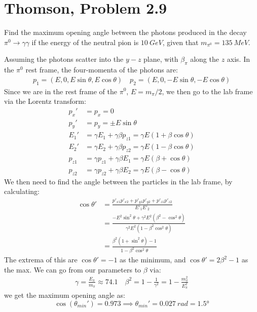 \documentclass[12pt]{article}
\begin{document}
\section{Thomson, Problem 2.9}
\begin{problem}
  Find the maximum opening angle between the photons produced in the decay $\pi^0\to\gamma\gamma$ if the energy of the neutral pion is $\SI{10}{GeV}$, given that $m_{\pi^0}=\SI{135}{MeV}$.
\end{problem}
Assuming the photons scatter into the $y-z$ plane, with $\beta_\pi$ along the $z$ axis. In the $\pi^0$ rest frame, the four-momenta of the photons are:
\begin{align*}
  p_1=(E, 0, E\sin\theta, E\cos\theta)\quad
  p_2=(E, 0,-E\sin\theta,-E\cos\theta)
\end{align*}
Since we are in the rest frame of the $\pi^0$, $E=m_\pi/2$, we then go to the lab frame via the Lorentz transform:
\begin{align*}
  p_x'&=p_x=0\\
  p_y'&=p_y=\pm E\sin\theta\\
  E_1'&=\gamma E_1+\gamma\beta p_{z1}=\gamma E(1+\beta\cos\theta)\\
  E_2'&=\gamma E_2+\gamma\beta p_{z2}=\gamma E(1-\beta\cos\theta)\\
  p_{z1}&=\gamma p_{z1}+\gamma\beta E_1=\gamma E(\beta+\cos\theta)\\
  p_{z2}&=\gamma p_{z2}+\gamma\beta E_2=\gamma E(\beta-\cos\theta)
\end{align*}
We then need to find the angle between the particles in the lab frame, by calculating:
\begin{align*}
  \cos\theta'&=\frac{p'_{x1}p'_{x2}+p'_{y1}p'_{y2}+p'_{z1}p'_{z2}}{E'_1E'_2}\\
  &=\frac{-E^2\sin^2\theta+\gamma^2E^2(\beta^2-\cos^2\theta)}
  {\gamma^2E^2(1-\beta^2\cos^2\theta)}\\
  &=\frac{\beta^2(1+\sin^2\theta)-1}{1-\beta^2\cos^2\theta}
\end{align*}
The extrema of this are $\cos\theta'=-1$ as the minimum, and $\cos\theta'=2\beta^2-1$ as the max. We can go from our parameters to $\beta$ via:
\begin{align*}
  \gamma=\frac{E_\pi}{m_\pi}\approx 74.1 \quad\beta^2=1-\frac1{\gamma^2}
  =1-\frac{m_\pi^2}{E_\pi^2}
\end{align*}
we get the maximum opening angle as:
\begin{equation}
  \label{eq:p6}
  \boxed{\cos(\theta_{min}')=0.973\implies\theta_{min}'=\SI{0.027}{rad}=\ang{1.5}}
\end{equation}
\newpage
\end{document}
